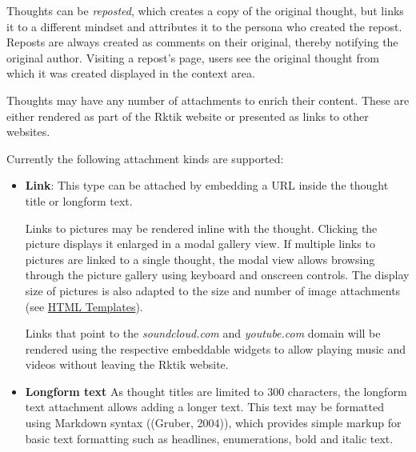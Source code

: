 Thoughts can be \emph{reposted}, which creates a copy of the original
thought, but links it to a different mindset and attributes it to the
persona who created the repost. Reposts are always created as comments
on their original, thereby notifying the original author. Visiting a
repost's page, users see the original thought from which it was created
displayed in the context area.


Thoughts may have any number of attachments to enrich their content.
These are either rendered as part of the Rktik website or presented as
links to other websites.

Currently the following attachment kinds are supported:

\begin{itemize}
\item
  \textbf{Link}: This type can be attached by embedding a URL inside the
  thought title or longform text.

  Links to pictures may be rendered inline with the thought. Clicking
  the picture displays it enlarged in a modal gallery view. If multiple
  links to pictures are linked to a single thought, the modal view
  allows browsing through the picture gallery using keyboard and
  onscreen controls. The display size of pictures is also adapted to the
  size and number of image attachments (see
  \hyperref[html-templates]{HTML Templates}).

  Links that point to the \emph{soundcloud.com} and \emph{youtube.com}
  domain will be rendered using the respective embeddable widgets to
  allow playing music and videos without leaving the Rktik website.
\item
  \textbf{Longform text} As thought titles are limited to 300
  characters, the longform text attachment allows adding a longer text.
  This text may be formatted using Markdown syntax ((Gruber, 2004)),
  which provides simple markup for basic text formatting such as
  headlines, enumerations, bold and italic text.
\end{itemize}


